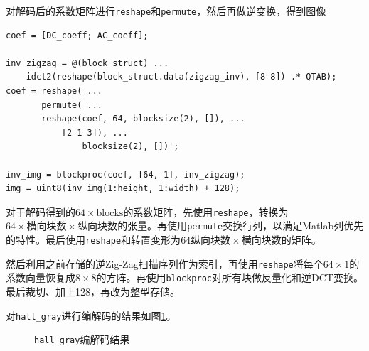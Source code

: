\documentclass[10pt, a4paper]{article}
\begin{document}
对解码后的系数矩阵进行\texttt{reshape}和\texttt{permute}，然后再做逆变换，得到图像

\begin{verbatim}
coef = [DC_coeff; AC_coeff];

inv_zigzag = @(block_struct) ...
    idct2(reshape(block_struct.data(zigzag_inv), [8 8]) .* QTAB);
coef = reshape( ...
       permute( ...
       reshape(coef, 64, blocksize(2), []), ...
           [2 1 3]), ...
               blocksize(2), [])';

inv_img = blockproc(coef, [64, 1], inv_zigzag);
img = uint8(inv_img(1:height, 1:width) + 128);
\end{verbatim}

对于解码得到的$64\times \text{blocks}$的系数矩阵，先使用\texttt{reshape}，转换为$64\times \text{横向块数} \times \text{纵向块数}$的张量。再使用\texttt{permute}交换行列，以满足Matlab列优先的特性。最后使用\texttt{reshape}和转置变形为$64\text{纵向块数}\times\text{横向块数}$的矩阵。

然后利用之前存储的逆Zig-Zag扫描序列作为索引，再使用\texttt{reshape}将每个$64\times1$的系数向量恢复成$8\times 8$的方阵。再使用\texttt{blockproc}对所有块做反量化和逆DCT变换。最后裁切、加上128，再改为整型存储。

对\texttt{hall_gray}进行编解码的结果如图\ref{fig:exp2_11}。

\begin{figure}[h]
    \centering
    \quad
    \caption{\texttt{hall_gray}编解码结果}
    \label{fig:exp2_11}
\end{figure}
\end{document}
